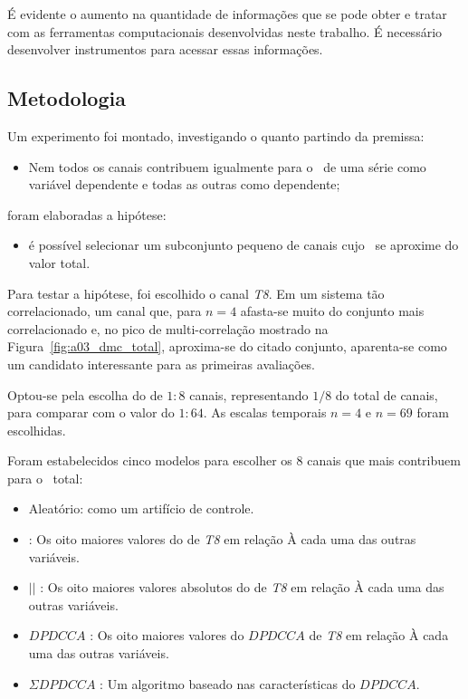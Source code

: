 É evidente o aumento na quantidade de informações que se pode obter e tratar com as ferramentas computacionais desenvolvidas neste trabalho. É necessário desenvolver instrumentos para acessar essas informações.



 

\subsection{Metodologia}

Um experimento foi montado, investigando o quanto partindo da premissa:

\begin{itemize}
  \item Nem todos os canais contribuem igualmente para o \dmc~de uma série como variável dependente e todas as outras como dependente;

\end{itemize}

foram elaboradas a hipótese:

\begin{itemize}
  \item é possível selecionar um subconjunto pequeno de canais cujo \dmc~se aproxime do valor total.
\end{itemize}

Para testar a hipótese, foi escolhido o canal \emph{T8}. Em um sistema tão correlacionado, um canal que, para $n=4$ afasta-se muito do conjunto mais correlacionado e, no pico de multi-correlação mostrado na Figura~\ref{fig:a03_dmc_total}, aproxima-se do citado conjunto, aparenta-se como um candidato interessante para as primeiras avaliações.

Optou-se pela escolha do \dmc de $1:8$ canais, representando $1/8$ do total de canais, para comparar com o valor do \dmc$1:64$. As escalas temporais $n=4$ e $n=69$ foram escolhidas.

Foram estabelecidos cinco modelos para escolher os 8 canais que mais contribuem para o \dmc~total:

\begin{itemize}
  \item Aleatório: como um artifício de controle.
  \item \pdcca : Os oito maiores valores do \pdcca de \emph{T8} em relação À cada uma das outras variáveis.
  \item $|$\pdcca$|$ : Os oito maiores valores absolutos do \pdcca de \emph{T8} em relação À cada uma das outras variáveis.
  \item $DPDCCA$ : Os oito maiores valores do $DPDCCA$ de \emph{T8} em relação À cada uma das outras variáveis.
  \item $\Sigma DPDCCA$ : Um algoritmo baseado nas características do $DPDCCA$.  
\end{itemize}


